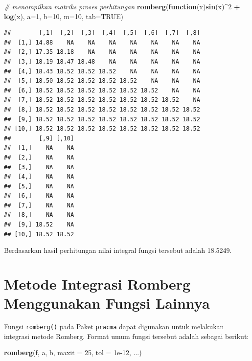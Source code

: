 \documentclass[
]{book}
\newenvironment{Shaded}{\begin{snugshade}}{\end{snugshade}}
\newcommand{\AttributeTok}[1]{\textcolor[rgb]{0.13,0.29,0.53}{#1}}
\newcommand{\CommentTok}[1]{\textcolor[rgb]{0.56,0.35,0.01}{\textit{#1}}}
\newcommand{\ConstantTok}[1]{\textcolor[rgb]{0.56,0.35,0.01}{#1}}
\newcommand{\ControlFlowTok}[1]{\textcolor[rgb]{0.13,0.29,0.53}{\textbf{#1}}}
\newcommand{\DecValTok}[1]{\textcolor[rgb]{0.00,0.00,0.81}{#1}}
\newcommand{\FloatTok}[1]{\textcolor[rgb]{0.00,0.00,0.81}{#1}}
\newcommand{\FunctionTok}[1]{\textcolor[rgb]{0.13,0.29,0.53}{\textbf{#1}}}
\newcommand{\NormalTok}[1]{#1}
\newcommand{\SpecialCharTok}[1]{\textcolor[rgb]{0.81,0.36,0.00}{\textbf{#1}}}
\theoremstyle{definition}
\theoremstyle{definition}
\theoremstyle{definition}
\theoremstyle{definition}
\theoremstyle{remark}
\begin{document}
\begin{Shaded}
\begin{Highlighting}[]
\CommentTok{\# menampilkan matriks proses perhitungan}
\FunctionTok{romberg}\NormalTok{(}\ControlFlowTok{function}\NormalTok{(x)}\FunctionTok{sin}\NormalTok{(x)}\SpecialCharTok{\^{}}\DecValTok{2} \SpecialCharTok{+} \FunctionTok{log}\NormalTok{(x),}
        \AttributeTok{a=}\DecValTok{1}\NormalTok{, }\AttributeTok{b=}\DecValTok{10}\NormalTok{, }\AttributeTok{m=}\DecValTok{10}\NormalTok{, }\AttributeTok{tab=}\ConstantTok{TRUE}\NormalTok{)}
\end{Highlighting}
\end{Shaded}

\begin{verbatim}
##        [,1]  [,2]  [,3]  [,4]  [,5]  [,6]  [,7]  [,8]
##  [1,] 14.88    NA    NA    NA    NA    NA    NA    NA
##  [2,] 17.35 18.18    NA    NA    NA    NA    NA    NA
##  [3,] 18.19 18.47 18.48    NA    NA    NA    NA    NA
##  [4,] 18.43 18.52 18.52 18.52    NA    NA    NA    NA
##  [5,] 18.50 18.52 18.52 18.52 18.52    NA    NA    NA
##  [6,] 18.52 18.52 18.52 18.52 18.52 18.52    NA    NA
##  [7,] 18.52 18.52 18.52 18.52 18.52 18.52 18.52    NA
##  [8,] 18.52 18.52 18.52 18.52 18.52 18.52 18.52 18.52
##  [9,] 18.52 18.52 18.52 18.52 18.52 18.52 18.52 18.52
## [10,] 18.52 18.52 18.52 18.52 18.52 18.52 18.52 18.52
##        [,9] [,10]
##  [1,]    NA    NA
##  [2,]    NA    NA
##  [3,]    NA    NA
##  [4,]    NA    NA
##  [5,]    NA    NA
##  [6,]    NA    NA
##  [7,]    NA    NA
##  [8,]    NA    NA
##  [9,] 18.52    NA
## [10,] 18.52 18.52
\end{verbatim}

Berdasarkan hasil perhitungan nilai integral fungsi tersebut adalah 18.5249.

\hypertarget{metode-integrasi-romberg-menggunakan-fungsi-lainnya}{%
\section{Metode Integrasi Romberg Menggunakan Fungsi Lainnya}\label{metode-integrasi-romberg-menggunakan-fungsi-lainnya}}

Fungsi \texttt{romberg()} pada Paket \texttt{pracma} dapat digunakan untuk melakukan integrasi metode Romberg. Format umum fungsi tersebut adalah sebagai berikut:

\begin{Shaded}
\begin{Highlighting}[]
\FunctionTok{romberg}\NormalTok{(f, a, b, }\AttributeTok{maxit =} \DecValTok{25}\NormalTok{, }\AttributeTok{tol =} \FloatTok{1e{-}12}\NormalTok{, ...)}
\end{Highlighting}
\end{Shaded}
\end{document}

